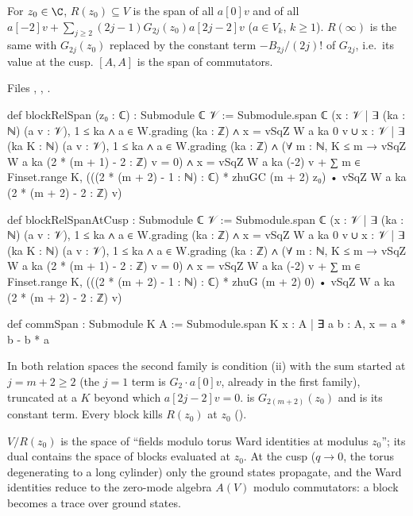 \begin{definition}\label{l15:def:blockrel}
For $z_0\in\C$, $R(z_0)\subseteq V$ is the span of all $a[0]v$ and of all
$a[-2]v+\sum_{j\ge2}(2j-1)G_{2j}(z_0)a[2j-2]v$ ($a\in V_k$, $k\ge1$). $R(\infty)$ is the same with $G_{2j}(z_0)$ replaced by
the constant term $-B_{2j}/(2j)!$ of $G_{2j}$, i.e.\ its value at the cusp. $[A,A]$ is the span of commutators.
\end{definition}
\noindent Files , ,
.
\begin{leancode}
def blockRelSpan (z₀ : ℂ) : Submodule ℂ 𝒱 :=
  Submodule.span ℂ
    ({x : 𝒱 | ∃ (ka : ℕ) (a v : 𝒱), 1 ≤ ka ∧ a ∈ W.grading (ka : ℤ) ∧ x = vSqZ W a ka 0 v} ∪
     {x : 𝒱 | ∃ (ka K : ℕ) (a v : 𝒱), 1 ≤ ka ∧ a ∈ W.grading (ka : ℤ) ∧
        (∀ m : ℕ, K ≤ m → vSqZ W a ka (2 * (m + 1) - 2 : ℤ) v = 0) ∧
        x = vSqZ W a ka (-2) v + ∑ m ∈ Finset.range K,
              (((2 * (m + 2) - 1 : ℕ) : ℂ) * zhuGC (m + 2) z₀)
                • vSqZ W a ka (2 * (m + 2) - 2 : ℤ) v})

def blockRelSpanAtCusp : Submodule ℂ 𝒱 :=
  Submodule.span ℂ
    ({x : 𝒱 | ∃ (ka : ℕ) (a v : 𝒱), 1 ≤ ka ∧ a ∈ W.grading (ka : ℤ) ∧ x = vSqZ W a ka 0 v} ∪
     {x : 𝒱 | ∃ (ka K : ℕ) (a v : 𝒱), 1 ≤ ka ∧ a ∈ W.grading (ka : ℤ) ∧
        (∀ m : ℕ, K ≤ m → vSqZ W a ka (2 * (m + 1) - 2 : ℤ) v = 0) ∧
        x = vSqZ W a ka (-2) v + ∑ m ∈ Finset.range K,
              (((2 * (m + 2) - 1 : ℕ) : ℂ) * zhuG (m + 2) 0)
                • vSqZ W a ka (2 * (m + 2) - 2 : ℤ) v})

def commSpan : Submodule K A := Submodule.span K {x : A | ∃ a b : A, x = a * b - b * a}
\end{leancode}

\begin{dictionary}
In both relation spaces the second family is condition (ii) with the sum started at $j=m+2\ge2$ (the $j=1$ term is
$G_2\cdot a[0]v$, already in the first family), truncated at a $K$ beyond which $a[2j-2]v=0$.  is
$G_{2(m+2)}(z_0)$ and  is its constant term. Every block kills $R(z_0)$ at $z_0$
(\allowbreak{}).
\end{dictionary}

\begin{physics}
$V/R(z_0)$ is the space of ``fields modulo torus Ward identities at modulus $z_0$''; its dual contains the space of
blocks evaluated at $z_0$. At the cusp ($q\to0$, the torus degenerating to a long cylinder) only the ground states
propagate, and the Ward identities reduce to the zero-mode algebra $A(V)$ modulo commutators: a block becomes a trace over
ground states.
\end{physics}

